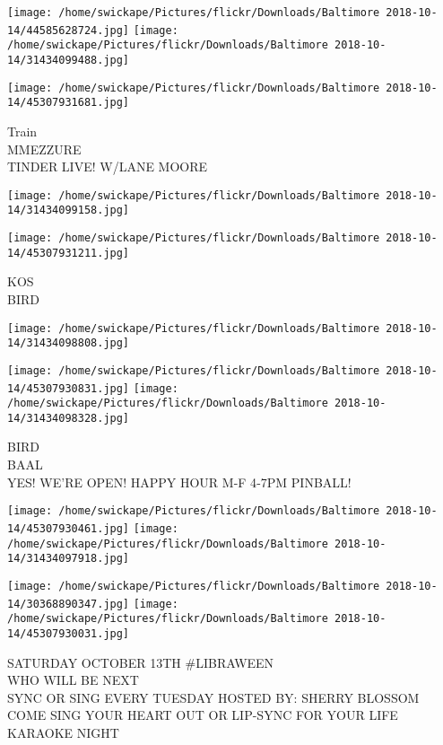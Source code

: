 \documentclass[10pt,letterpaper]{article}
\begin{document}
\texttt{[image: /home/swickape/Pictures/flickr/Downloads/Baltimore 2018-10-14/44585628724.jpg]}
\texttt{[image: /home/swickape/Pictures/flickr/Downloads/Baltimore 2018-10-14/31434099488.jpg]}

\texttt{[image: /home/swickape/Pictures/flickr/Downloads/Baltimore 2018-10-14/45307931681.jpg]}

Train\\
MMEZZURE\\
TINDER LIVE! W/LANE MOORE
\pagebreak

\texttt{[image: /home/swickape/Pictures/flickr/Downloads/Baltimore 2018-10-14/31434099158.jpg]}

\vspace{0.25in}
\texttt{[image: /home/swickape/Pictures/flickr/Downloads/Baltimore 2018-10-14/45307931211.jpg]}

KOS\\
BIRD
\pagebreak

\texttt{[image: /home/swickape/Pictures/flickr/Downloads/Baltimore 2018-10-14/31434098808.jpg]}

\vspace{0.25in}
\texttt{[image: /home/swickape/Pictures/flickr/Downloads/Baltimore 2018-10-14/45307930831.jpg]}
\texttt{[image: /home/swickape/Pictures/flickr/Downloads/Baltimore 2018-10-14/31434098328.jpg]}

BIRD\\
BAAL\\
YES!  WE'RE OPEN!  HAPPY HOUR M{-}F 4{-}7PM PINBALL!
\pagebreak

\texttt{[image: /home/swickape/Pictures/flickr/Downloads/Baltimore 2018-10-14/45307930461.jpg]}
\texttt{[image: /home/swickape/Pictures/flickr/Downloads/Baltimore 2018-10-14/31434097918.jpg]}

\texttt{[image: /home/swickape/Pictures/flickr/Downloads/Baltimore 2018-10-14/30368890347.jpg]}
\texttt{[image: /home/swickape/Pictures/flickr/Downloads/Baltimore 2018-10-14/45307930031.jpg]}

SATURDAY OCTOBER 13TH \#LIBRAWEEN\\
WHO WILL BE NEXT\\
SYNC OR SING EVERY TUESDAY HOSTED BY: SHERRY BLOSSOM COME SING YOUR HEART OUT OR LIP{-}SYNC FOR YOUR LIFE\\
KARAOKE NIGHT
\pagebreak
\end{document}
